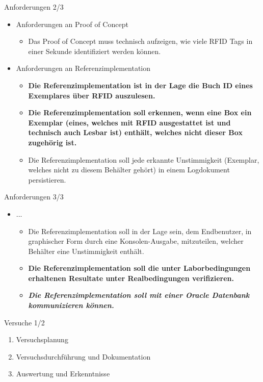 \documentclass{beamer}
\begin{document}
\begin{frame}{Anforderungen 2/3}
\begin{itemize}
    \item Anforderungen an Proof of Concept
    \begin{itemize}
        \item Das Proof of Concept muss technisch aufzeigen, wie viele RFID Tags in einer Sekunde identifiziert werden können.
    \end{itemize}
    \item Anforderungen an Referenzimplementation
    \begin{itemize}
        \item \textbf{Die Referenzimplementation ist in der Lage die Buch ID eines Exemplares über RFID auszulesen.}
        \item \textbf{Die Referenzimplementation soll erkennen, wenn eine Box ein Exemplar (eines, welches mit RFID ausgestattet ist und technisch auch Lesbar ist) enthält, welches nicht dieser Box zugehörig ist.}
        \item Die Referenzimplementation soll jede erkannte Unstimmigkeit (Exemplar, welches nicht zu diesem Behälter gehört) in einem Logdokument persistieren.
    \end{itemize}
\end{itemize}
\end{frame}
\begin{frame}{Anforderungen 3/3}
\begin{itemize}
    \item ...
    \begin{itemize}
        \item Die Referenzimplementation soll in der Lage sein, dem Endbenutzer, in graphischer Form durch eine Konsolen-Ausgabe, mitzuteilen, welcher Behälter eine Unstimmigkeit enthält.
        \item \textbf{Die Referenzimplementation soll die unter Laborbedingungen erhaltenen Resultate unter Realbedingungen verifizieren.}
        \item \textbf{\textit{Die Referenzimplementation soll mit einer Oracle Datenbank kommunizieren können.}}
    \end{itemize}
 \end{itemize}
\end{frame}
\begin{frame}{Versuche 1/2}
\begin{enumerate}
    \item Versuchsplanung
    \item Versuchsdurchführung und Dokumentation
    \item Auswertung und Erkenntnisse
\end{enumerate}
\end{frame}
\end{document}
